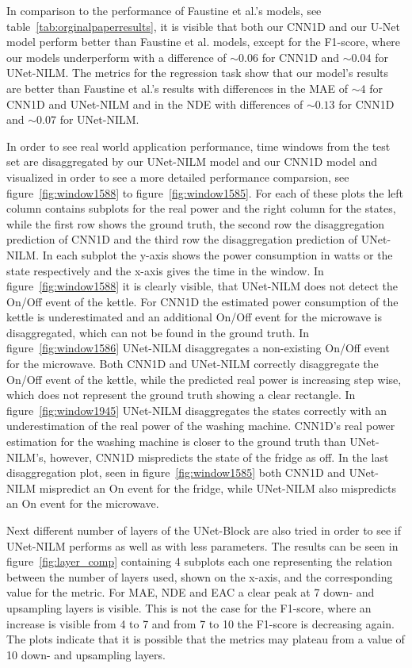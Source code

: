 \documentclass[sigconf]{acmart}
\begin{document}
In comparison to the performance of Faustine et al.'s models, see table~\ref{tab:orginalpaperresults}, it is visible that 
both our CNN1D and our U-Net model perform better than Faustine et al. models, except for the F1-score, where our models underperform with a difference 
of $\sim 0.06$ for CNN1D and $\sim 0.04$ for UNet-NILM. The metrics for the regression task show that our model's results are better than
Faustine et al.'s results with differences in the MAE of $\sim 4$ for CNN1D and UNet-NILM and in the NDE with differences of $\sim 0.13$ for CNN1D and $\sim 0.07$ for UNet-NILM.

In order to see real world application performance, time windows from the test set are disaggregated by our 
UNet-NILM model and our CNN1D model and visualized in order to see a more detailed performance comparsion, see figure~\ref{fig:window1588} to figure~\ref{fig:window1585}. 
For each of these plots the left column contains subplots for the real power and the right column for the states,
while the first row shows the ground truth, the second row the disaggregation prediction of CNN1D and the third row the disaggregation prediction of UNet-NILM.
In each subplot the y-axis shows the power consumption in watts or the state respectively and the x-axis gives the time in the window. 
In figure~\ref{fig:window1588} it is clearly visible, that UNet-NILM does not detect the On/Off event of the kettle. For CNN1D
the estimated power consumption of the kettle is underestimated and an additional On/Off event for the microwave is disaggregated,
which can not be found in the ground truth. 
In figure~\ref{fig:window1586} UNet-NILM disaggregates a non-existing On/Off event for the microwave. Both CNN1D and UNet-NILM correctly disaggregate 
the On/Off event of the kettle, while the predicted real power is increasing step wise, which does not represent the ground truth showing a clear rectangle.
In figure~\ref{fig:window1945} UNet-NILM disaggregates the states correctly with an underestimation of the real power of the washing machine. 
CNN1D's real power estimation for the washing machine is closer to the ground truth than UNet-NILM's, however, CNN1D mispredicts the state of the fridge as off. 
In the last disaggregation plot, seen in figure~\ref{fig:window1585} both CNN1D and UNet-NILM mispredict an On event for the fridge, while 
UNet-NILM also mispredicts an On event for the microwave.

Next different number of layers of the UNet-Block are also tried in order to see if UNet-NILM performs as well as with less parameters.
The results can be seen in figure~\ref{fig:layer_comp} containing 4 subplots each one representing the relation between 
the number of layers used, shown on the x-axis, and the corresponding value for the metric.
For MAE, NDE and EAC a clear peak at 7 down- and upsampling layers is visible. 
This is not the case for the F1-score, where an increase is visible from 4 to 7 and from 7 to 10 the F1-score is decreasing again.
The plots indicate that it is possible that the metrics may plateau from a value of 10 down- and upsampling layers.
\end{document}
